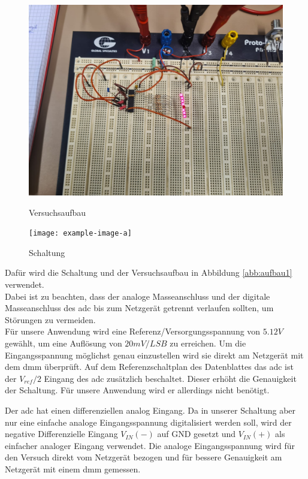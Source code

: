 \documentclass[12pt, a4paper, ngerman]{article}
\begin{document}
\begin{figure}%
  \centering
  \begin{minipage}[b]{0.49\textwidth}
    \includegraphics[width=\textwidth]{versuch_1_versuchsaufbau.jpeg}
    \caption{Versuchsaufbau}
    \label{abb:aufbau1}
  \end{minipage}
  \hfill
  \begin{minipage}[b]{0.49\textwidth}
    \texttt{[image: example-image-a]}
    \caption{Schaltung}
    \label{abb:schaltung}
  \end{minipage}
\end{figure}


Dafür wird die Schaltung %
und der Versuchsaufbau in Abbildung \ref{abb:aufbau1} verwendet. \\
Dabei ist zu beachten, dass der analoge Masseanschluss und der digitale Masseanschluss des \ac{adc}
bis zum Netzgerät getrennt verlaufen sollten, um Störungen zu vermeiden. \\
Für unsere Anwendung wird eine Referenz/Versorgungsspannung von $5.12V$ gewählt, um eine Auflösung von $20mV/LSB$ zu erreichen.
Um die Eingangsspannung möglichst genau einzustellen wird sie direkt am Netzgerät mit dem \ac{dmm} überprüft.
Auf dem Referenzschaltplan des Datenblattes das \ac{adc} ist der $V_{ref}/2$ Eingang
des \ac{adc} zusätzlich beschaltet. Dieser erhöht die Genauigkeit der Schaltung. %
Für unsere Anwendung wird er allerdings nicht benötigt.

Der \ac{adc} hat einen differenziellen analog Eingang.
Da in unserer Schaltung aber nur eine einfache analoge Eingangsspannung digitalisiert werden soll,
wird der negative Differenzielle Eingang $V_{IN}(-)$ auf GND gesetzt und $V_{IN}(+)$ als einfacher analoger Eingang verwendet.
Die analoge Eingangsspannung wird für den Versuch direkt vom Netzgerät bezogen
und für bessere Genauigkeit am Netzgerät mit einem \ac{dmm} gemessen.
\end{document}
